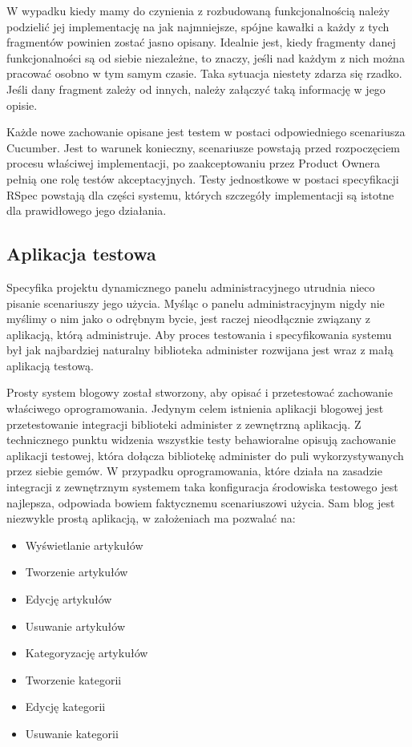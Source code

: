   W wypadku kiedy mamy do czynienia z rozbudowaną funkcjonalnością należy podzielić jej implementację na jak najmniejsze, spójne kawałki a każdy z tych fragmentów powinien zostać jasno opisany. Idealnie jest, kiedy fragmenty danej funkcjonalności są od siebie niezależne, to znaczy, jeśli nad każdym z nich można pracować osobno w tym samym czasie. Taka sytuacja niestety zdarza się rzadko. Jeśli dany fragment zależy od innych, należy załączyć taką informację w jego opisie.
  
  Każde nowe zachowanie opisane jest testem w postaci odpowiedniego scenariusza Cucumber. Jest to warunek konieczny, scenariusze powstają przed rozpoczęciem procesu właściwej implementacji, po zaakceptowaniu przez Product Ownera pełnią one rolę testów akceptacyjnych. Testy jednostkowe w postaci specyfikacji RSpec powstają dla części systemu, których szczegóły implementacji są istotne dla prawidłowego jego działania.
  
  \subsection{Aplikacja testowa}
  Specyfika projektu dynamicznego panelu administracyjnego utrudnia nieco pisanie scenariuszy jego użycia. Myśląc o panelu administracyjnym nigdy nie myślimy o nim jako o odrębnym bycie, jest raczej nieodłącznie związany z aplikacją, którą administruje. Aby proces testowania i specyfikowania systemu był jak najbardziej naturalny biblioteka administer rozwijana jest wraz z małą aplikacją testową.
  
  Prosty system blogowy został stworzony, aby opisać i przetestować zachowanie właściwego oprogramowania. Jedynym celem istnienia aplikacji blogowej jest przetestowanie integracji biblioteki administer z zewnętrzną aplikacją. Z technicznego punktu widzenia wszystkie testy behawioralne opisują zachowanie aplikacji testowej, która dołącza bibliotekę administer do puli wykorzystywanych przez siebie gemów. W przypadku oprogramowania, które działa na zasadzie integracji z zewnętrznym systemem taka konfiguracja środowiska testowego jest najlepsza, odpowiada bowiem faktycznemu scenariuszowi użycia. Sam blog jest niezwykle prostą aplikacją, w założeniach ma pozwalać na:
  
  \begin{itemize}
    \item Wyświetlanie artykułów
    \item Tworzenie artykułów
    \item Edycję artykułów
    \item Usuwanie artykułów
    \item Kategoryzację artykułów
    \item Tworzenie kategorii
    \item Edycję kategorii
    \item Usuwanie kategorii
  \end{itemize}
  
